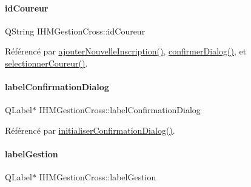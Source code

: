 \mbox{\label{class_i_h_m_gestion_cross_a9352a649126c14e7d0da3694c10c3cef}} 
\paragraph{\texorpdfstring{id\+Coureur}{idCoureur}}
{\footnotesize\ttfamily Q\+String I\+H\+M\+Gestion\+Cross\+::id\+Coureur\hspace{0.3cm}{\ttfamily [private]}}



Référencé par \hyperlink{class_i_h_m_gestion_cross_af0165d32344af78b4edce59f88c90ff6}{ajouter\+Nouvelle\+Inscription()}, \hyperlink{class_i_h_m_gestion_cross_a144933ab31ae263be7267b93bfd53a82}{confirmer\+Dialog()}, et \hyperlink{class_i_h_m_gestion_cross_ad71963d500fd61995fdae94e833db163}{selectionner\+Coureur()}.

\mbox{\label{class_i_h_m_gestion_cross_a9b51d06493979981248ecc2641f82be4}} 
\paragraph{\texorpdfstring{label\+Confirmation\+Dialog}{labelConfirmationDialog}}
{\footnotesize\ttfamily Q\+Label$\ast$ I\+H\+M\+Gestion\+Cross\+::label\+Confirmation\+Dialog\hspace{0.3cm}{\ttfamily [private]}}



Référencé par \hyperlink{class_i_h_m_gestion_cross_aa1c728319c825df582a014fc5bd43ea4}{initialiser\+Confirmation\+Dialog()}.

\mbox{\label{class_i_h_m_gestion_cross_abfb2504c2d5189d08e24677e04ddf3ba}} 
\paragraph{\texorpdfstring{label\+Gestion}{labelGestion}}
{\footnotesize\ttfamily Q\+Label$\ast$ I\+H\+M\+Gestion\+Cross\+::label\+Gestion\hspace{0.3cm}{\ttfamily [private]}}



